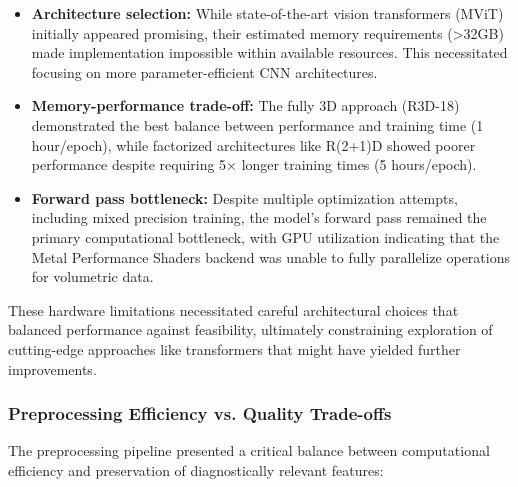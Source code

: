 \documentclass[12pt, a4paper]{article}
\begin{document}
\begin{itemize}
    \item \textbf{Architecture selection:} While state-of-the-art vision transformers (MViT) initially appeared promising, their estimated memory requirements (>32GB) made implementation impossible within available resources. This necessitated focusing on more parameter-efficient CNN architectures.
    
    \item \textbf{Memory-performance trade-off:} The fully 3D approach (R3D-18) demonstrated the best balance between performance and training time (1 hour/epoch), while factorized architectures like R(2+1)D showed poorer performance despite requiring 5× longer training times (5 hours/epoch).
    
    \item \textbf{Forward pass bottleneck:} Despite multiple optimization attempts, including mixed precision training, the model's forward pass remained the primary computational bottleneck, with GPU utilization indicating that the Metal Performance Shaders backend was unable to fully parallelize operations for volumetric data.
\end{itemize}

These hardware limitations necessitated careful architectural choices that balanced performance against feasibility, ultimately constraining exploration of cutting-edge approaches like transformers that might have yielded further improvements.

\subsubsection{Preprocessing Efficiency vs. Quality Trade-offs}

The preprocessing pipeline presented a critical balance between computational efficiency and preservation of diagnostically relevant features:
\end{document}
